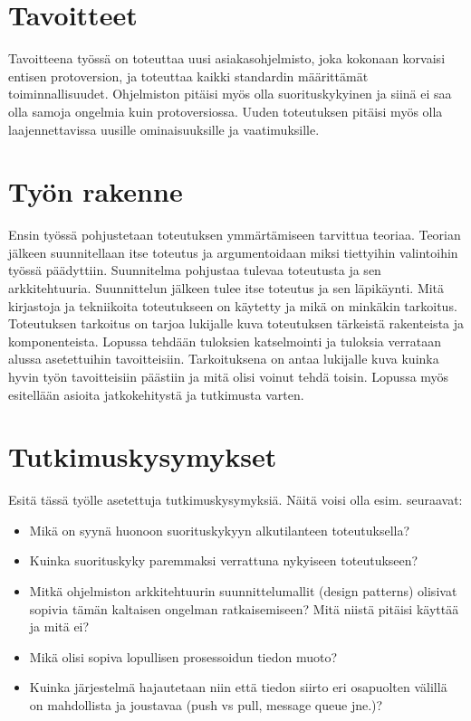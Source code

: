 \section{Tavoitteet}

Tavoitteena työssä on toteuttaa uusi asiakasohjelmisto, joka kokonaan korvaisi entisen protoversion, ja toteuttaa kaikki standardin määrittämät toiminnallisuudet. Ohjelmiston pitäisi myös olla suorituskykyinen ja siinä ei saa olla samoja ongelmia kuin protoversiossa. Uuden toteutuksen pitäisi myös olla laajennettavissa uusille ominaisuuksille ja vaatimuksille.

\section{Työn rakenne}

Ensin työssä pohjustetaan toteutuksen ymmärtämiseen tarvittua teoriaa. Teorian jälkeen suunnitellaan itse toteutus ja argumentoidaan miksi tiettyihin valintoihin työssä päädyttiin. Suunnitelma pohjustaa tulevaa toteutusta ja sen arkkitehtuuria. Suunnittelun jälkeen tulee itse toteutus ja sen läpikäynti. Mitä kirjastoja ja tekniikoita toteutukseen on käytetty ja mikä on minkäkin tarkoitus. Toteutuksen tarkoitus on tarjoa lukijalle kuva toteutuksen tärkeistä rakenteista ja komponenteista. Lopussa tehdään tuloksien katselmointi ja tuloksia verrataan alussa asetettuihin tavoitteisiin. Tarkoituksena on antaa lukijalle kuva kuinka hyvin työn tavoitteisiin päästiin ja mitä olisi voinut tehdä toisin. Lopussa myös esitellään asioita jatkokehitystä ja tutkimusta varten.

\section{Tutkimuskysymykset}
\begin{it}
	Esitä tässä työlle asetettuja tutkimuskysymyksiä. Näitä voisi olla esim. seuraavat:
	\begin{itemize}
		\item Mikä on syynä huonoon suorituskykyyn alkutilanteen toteutuksella?
		\item Kuinka suorituskyky paremmaksi verrattuna nykyiseen toteutukseen?
		\item Mitkä ohjelmiston arkkitehtuurin suunnittelumallit (design patterns) olisivat sopivia tämän kaltaisen ongelman ratkaisemiseen? Mitä niistä pitäisi käyttää ja mitä ei?
		\item Mikä olisi sopiva lopullisen prosessoidun tiedon muoto?
		\item Kuinka järjestelmä hajautetaan niin että tiedon siirto eri osapuolten välillä on mahdollista ja joustavaa (push vs pull, message queue jne.)?
	\end{itemize}
\end{it}
